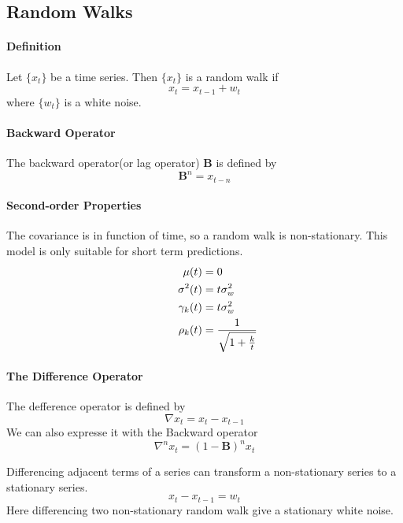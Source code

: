 \subsection{Random Walks}

\paragraph{Definition}
Let $\{x_t\}$ be a time series. Then $\{x_t\}$ is a random walk if 
\[ x_t = x_{t-1} + w_t \]
where $\{w_t\}$ is a white noise.

\paragraph{Backward Operator}
The backward operator(or lag operator)  $\mathbf{B}$ is defined by
\[ \mathbf{B}^n = x_{t-n} \]

\paragraph{Second-order Properties}
The covariance is in function of time, so a random walk is non-stationary. This model is only suitable for short term predictions.
\begin{align*}
        \hspace*{1cm}
      \mu(t) &= 0 \\
      \sigma^2(t) &= t\sigma_w^2 \\
      \gamma_k(t) &= t\sigma_w^2 \\
      \rho_k(t) &= \frac{1}{\sqrt{1 + \frac{k}{t}}}
\end{align*} 

\paragraph{The Difference Operator}
The defference operator is defined by
\[ \nabla x_t = x_t - x_{t-1} \] 
We can also expresse it with the Backward operator
\[ \nabla^n x_t  = (1 - \mathbf{B})^n x_t \]
\begin{note}
Differencing adjacent terms of a series can transform a non-stationary series to a stationary series.
    \[ x_t - x_{t-1} = w_t \]
Here differencing two non-stationary random walk give a stationary white noise.
\end{note}

